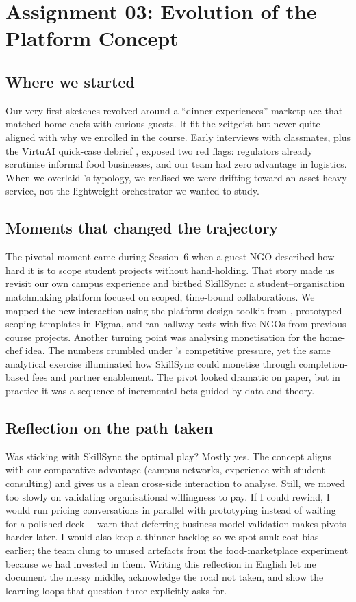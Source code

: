 \section*{Assignment 03: Evolution of the Platform Concept}

\subsection*{Where we started}
Our very first sketches revolved around a ``dinner experiences'' marketplace that matched home chefs with curious guests. It fit the zeitgeist but never quite aligned with why we enrolled in the course. Early interviews with classmates, plus the VirtuAI quick-case debrief \citep{Gunasilan2024}, exposed two red flags: regulators already scrutinise informal food businesses, and our team had zero advantage in logistics. When we overlaid \citet{Choudary2016}'s typology, we realised we were drifting toward an asset-heavy service, not the lightweight orchestrator we wanted to study.

\subsection*{Moments that changed the trajectory}
The pivotal moment came during Session~6 when a guest NGO described how hard it is to scope student projects without hand-holding. That story made us revisit our own campus experience and birthed SkillSync: a student--organisation matchmaking platform focused on scoped, time-bound collaborations. We mapped the new interaction using the platform design toolkit from \citet{Reillier2017}, prototyped scoping templates in Figma, and ran hallway tests with five NGOs from previous course projects. Another turning point was analysing monetisation for the home-chef idea. The numbers crumbled under \citet{Porter2008}'s competitive pressure, yet the same analytical exercise illuminated how SkillSync could monetise through completion-based fees and partner enablement. The pivot looked dramatic on paper, but in practice it was a sequence of incremental bets guided by data and theory.

\subsection*{Reflection on the path taken}
Was sticking with SkillSync the optimal play? Mostly yes. The concept aligns with our comparative advantage (campus networks, experience with student consulting) and gives us a clean cross-side interaction to analyse. Still, we moved too slowly on validating organisational willingness to pay. If I could rewind, I would run pricing conversations in parallel with prototyping instead of waiting for a polished deck---\citet{HagiuWright2013} warn that deferring business-model validation makes pivots harder later. I would also keep a thinner backlog so we spot sunk-cost bias earlier; the team clung to unused artefacts from the food-marketplace experiment because we had invested in them. Writing this reflection in English let me document the messy middle, acknowledge the road not taken, and show the learning loops that question three explicitly asks for.
